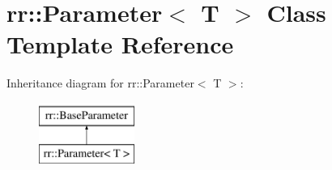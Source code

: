 \hypertarget{classrr_1_1_parameter}{\section{rr\-:\-:Parameter$<$ T $>$ Class Template Reference}
\label{classrr_1_1_parameter}
}
Inheritance diagram for rr\-:\-:Parameter$<$ T $>$\-:\begin{figure}[H]
\begin{center}
\leavevmode
\includegraphics[height=2.000000cm]{classrr_1_1_parameter}
\end{center}
\end{figure}
